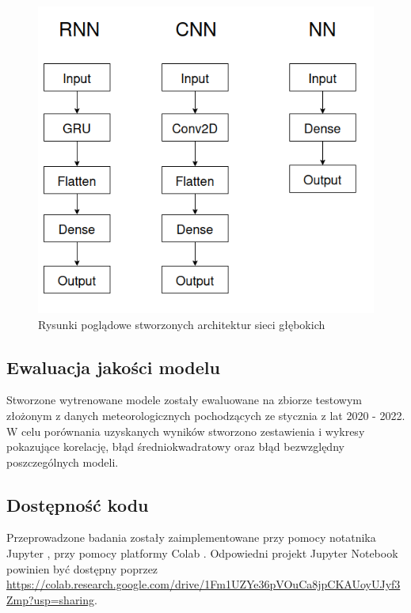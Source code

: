 \begin{figure}[H]
    \centering
    \includegraphics[width=\textwidth]{images/architectures.png}
    \caption[opis dla siatki]{Rysunki poglądowe stworzonych architektur sieci
    głębokich}
    \label{arch}
\end{figure}

\subsection{Ewaluacja jakości modelu}

Stworzone wytrenowane modele zostały ewaluowane na zbiorze testowym złożonym
z danych meteorologicznych pochodzących ze stycznia z lat 2020 - 2022.
W celu porównania uzyskanych wyników stworzono zestawienia i wykresy pokazujące
korelację, błąd średniokwadratowy oraz błąd bezwzględny poszczególnych modeli.

\subsection{Dostępność kodu}

Przeprowadzone badania zostały zaimplementowane przy pomocy notatnika Jupyter
\cite{jupyter}, przy pomocy platformy Colab \cite{colab}. Odpowiedni projekt
Jupyter Notebook powinien być dostępny poprzez \url{https://colab.research.google.com/drive/1Fm1UZYe36pVOuCa8jpCKAUoyUJyf3Zmp?usp=sharing}.